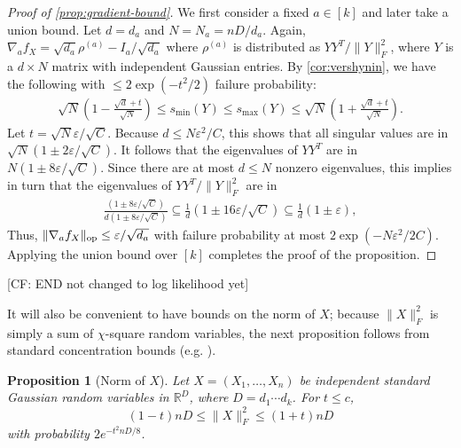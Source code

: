 \documentclass[aos]{imsart}
\newtheorem{prop}[theorem]{Proposition}
\theoremstyle{definition}
\numberwithin{equation}{section}
\DeclareMathOperator{\op}{op}
\DeclarePairedDelimiter{\norm}{\lVert}{\rVert}
\newcommand{\R}{{\mathbb{R}}}
\newcommand{\eps}{\varepsilon}
\newcommand{\cN}{\mathcal{N}}
\newcommand{\rv}{X}
\newcommand{\CF}[1]{{\color{purple}[CF: #1]}}
\begin{document}
\begin{proof}[Proof of \cref{prop:gradient-bound}]
We first consider a fixed $a\in[k]$ and later take a union bound.
Let $d = d_a$ and $N = N_a = n D/d_a$.
Again, $\nabla_a f_{\rv} = \sqrt{d_a} \rho^{(a)} - I_a/\sqrt{d_a}$ where $\rho^{(a)}$ is distributed as $Y Y^T/\|Y\|_F^2$, where $Y$ is a $d \times N$ matrix with independent Gaussian entries.
By \cref{cor:vershynin}, we have the following with $\leq 2 \exp(-t^2/2)$ failure probability:
\begin{align*}
  \sqrt{N} \left( 1 -  \frac{\sqrt{d} + t }{\sqrt{N}}  \right)\leq s_{\min}(Y) \leq s_{\max}(Y) \leq  \sqrt{N} \left( 1 + \frac{\sqrt{d} + t }{\sqrt{N}} \right).
\end{align*}
Let $t = \sqrt{N} \eps / \sqrt{C}$.
Because $d \leq N \eps^2 / C$, this shows that all singular values are in $\sqrt{N} \left( 1 \pm 2\eps/\sqrt{C} \right)$.
It follows that the eigenvalues of $YY^T$ are in $N \left( 1 \pm 8\eps/\sqrt{C} \right)$.
Since there are at most $d \leq N$ nonzero eigenvalues, this implies in turn that the eigenvalues of $Y Y^T/\|Y\|_F^2$ are in
\begin{align*}
\frac {\left( 1 \pm 8\eps/\sqrt{C} \right)} {d \left( 1 \pm 8\eps/\sqrt{C} \right)} \subseteq \frac1d \left( 1 \pm 16\eps/\sqrt{C} \right) \subseteq \frac1d \left( 1 \pm \eps \right),
\end{align*}
Thus,
$\norm{\nabla_a f_{\rv}}_{\op} \leq \eps/\sqrt{d_a}$
with failure probability at most $2 \exp(-N \eps^2/2C)$.
Applying the union bound over $[k]$ completes the proof of the proposition.
\end{proof}
\CF{END not changed to log likelihood yet}

It will also be convenient to have bounds on the norm of $X$; because $\|X\|_F^2$ is simply a sum of $\chi$-square random variables, the next proposition follows from standard concentration bounds (e.g. \cite{W19}).
\begin{prop}[Norm of $X$]\label{prp:xnorm}
Let $\rv = (\rv_1,\dots,\rv_n)$ be independent standard Gaussian random variables in $\R^D$, where $D=d_1\cdots{}d_k$. For $t \leq c$,
$$ (1 - t) nD \leq \|X\|_F^2 \leq (1 + t)nD$$ with probability $2e^{-t^2 nD/8}$.
\end{prop}
\end{document}
